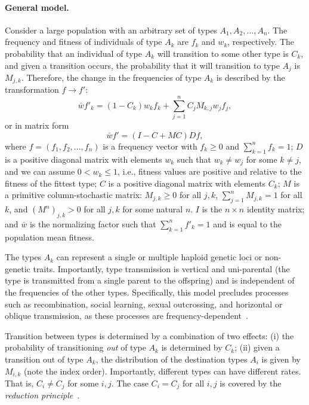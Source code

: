 \documentclass[9pt, a4paper, twocolumn]{extarticle}
\newcommand{\ci}{I}
\begin{document}
\paragraph*{General model.}\label{sec:general_model}
Consider a large  population with an arbitrary set of types $A_1, A_2, \ldots, A_n$.
The frequency and fitness of individuals of type $A_k$ are $f_k$ and $w_k$, respectively.
The probability that an individual of type $A_k$ will transition to some other type is $C_k$, and given a transition occurs, the probability that it will transition to type $A_j$ is $M_{j,k}$.
Therefore, the change in the frequencies of type $A_k$ is described by the transformation $f \to f'$: 
\begin{equation}
\bar{w} f'_k = (1-C_k) w_k f_k + \sum_{j=1}^{n}{C_j M_{k,j} w_j f_j},
\label{eq:model_sum}
\end{equation}
or in matrix form
\begin{equation}
\bar{w} f' = (\ci - C + MC)D f,
\label{eq:model}
\end{equation}
where $f=(f_1, f_2, \ldots, f_n)$ is a frequency vector with $f_k\ge 0$ and  $\sum_{k=1}^n{f_k} = 1$;
$D$ is a positive diagonal matrix with  elements $w_k$ such that $w_k \ne w_j$ for some $k \ne j$, and we can assume $0 < w_k \le 1$, i.e., fitness values are positive and relative to the fitness of the fittest type; 
$C$ is a positive diagonal  matrix with  elements $C_k$;
$M$ is a primitive column-stochastic matrix: $M_{j,k} \ge 0$ for all $j,k$, $\sum_{j=1}^n {M_{j,k}} = 1$ for all $k$, and $(M^n)_{j,k} > 0$ for all $j,k$ for some natural $n$.
$\ci$ is the $n\times n$ identity matrix;
and $\bar{w}$ is the normalizing factor such that $\sum_{k=1}^n{f'_k}=1$ and is equal to the population mean fitness.

The types $A_k$ can represent a single or multiple haploid genetic loci or non-genetic traits.
Importantly, type transmission is vertical and uni-parental (the type is transmitted from a single parent to the offspring) and is independent of the frequencies of the other types.
Specifically, this model precludes processes such as recombination, social learning, sexual outcrossing, and horizontal or oblique transmission, as these processes are frequency-dependent~\cite[pg.~54]{Cavalli-Sforza1981}.

Transition between types is determined by a combination of two effects:
(i) the probability of transitioning \emph{out} of type $A_k$ is determined by $C_k$;
(ii) given a transition out of type $A_k$, the distribution of the destination types $A_i$ is given by $M_{i,k}$ (note the index order).
Importantly, different types can have different rates.
That is, $C_i \ne C_j$ for some $i,j$. The case $C_i = C_j$ for all $i,j$ is covered by the \emph{reduction principle}~\citep[see][]{Altenberg2017}.
\end{document}
